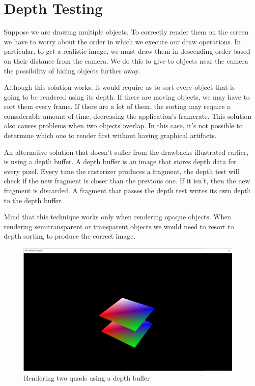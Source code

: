 \chapter{Depth Testing}

Suppose we are drawing multiple objects.
To correctly render them on the screen we have to worry about
the order in which we execute our draw operations.
In particular, to get a realistic image, we must draw
them in descending order based on their distance from the camera.
We do this to give to objects near the camera the possibility
of hiding objects further away.

Although this solution works, it would require us to sort
every object that is going to be rendered using its depth.
If there are moving objects, we may have to sort them every frame.
If there are a lot of them, the sorting may require a considerable
amount of time, decreasing the application's framerate.
This solution also causes problems when two objects overlap.
In this case, it's not possible to determine which one
to render first without having graphical artifacts.

An alternative solution that doesn't suffer from the drawbacks
illustrated earlier, is using a depth buffer.
A depth buffer is an image that stores depth data for every pixel.
Every time the rasterizer produces a fragment, the depth test will
check if the new fragment is closer than the previous one.
If it isn't, then the new fragment is discarded.
A fragment that passes the depth test writes its own depth to the
depth buffer.

Mind that this technique works only when rendering opaque objects.
When rendering semitransparent or transparent objects we would need
to resort to depth sorting to produce the correct image.

\begin{figure}[H]
    \centering
    \includegraphics[scale=0.20]{images/ChDepthTesting/DepthTesting.png}
    \caption{Rendering two quads using a depth buffer}
    \label{fig::DepthTesting}
\end{figure}

